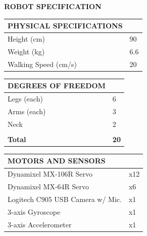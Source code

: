\documentclass[10pt,a4paper]{article}
\begin{document}
\begin{center}
	\colorbox[rgb]{0.0, 0.0, 0.0}
	{
	\begin{minipage}[c][3em][c]{\textwidth}
		{\color{textcolour}
			{
			\begin{Large}
				\textbf{ROBOT SPECIFICATION}
			\end{Large}
			}
		}
	\end{minipage}
	}
\end{center}

\begin{multicols}{2}
\begin{table}[H]
	\begin{tabular}{|m{5.7cm}|m{1.15cm}|}
		\hline
		\rowcolor[rgb]{0.0, 0.0, 0.0}
		{\color{textcolour}\textbf{{PHYSICAL SPECIFICATIONS}}} & \\
		\hline
		Height (cm) & 90 \\
		\hline
		Weight (kg) & 6.6 \\
		\hline
		Walking Speed (cm/s) & 20 \\
		\hline
	\end{tabular}
\end{table}

\begin{table}[H]
	\begin{tabular}{|m{5.7cm}|m{1.15cm}|}
		\hline
		\rowcolor[rgb]{0.0, 0.0, 0.0}
		{\color{textcolour}\textbf{{DEGREES OF FREEDOM}}} & \\
		\hline
		Legs (each) & 6 \\
		\hline
		Arms (each) & 3 \\
		\hline
		Neck & 2 \\
		\hline
		& \\
		\hline
		\textbf{Total} & \textbf{20} \\
		\hline
	\end{tabular}
\end{table}

\begin{table}[H]
	\begin{tabular}{|m{5.7cm}|m{1.15cm}|}
		\hline
		\rowcolor[rgb]{0.0, 0.0, 0.0}
		{\color{textcolour}\textbf{{MOTORS AND SENSORS}}} & \\
		\hline
		Dynamixel MX-106R Servo & x12 \\
		\hline
		Dynamixel MX-64R Servo & x6 \\
		\hline
		Logitech C905 USB Camera w/ Mic. & x1 \\
		\hline
		3-axis Gyroscope & x1 \\
		\hline
		3-axis Accelerometer & x1 \\
		\hline
	\end{tabular}
\end{table}


\end{multicols}
\end{document}
